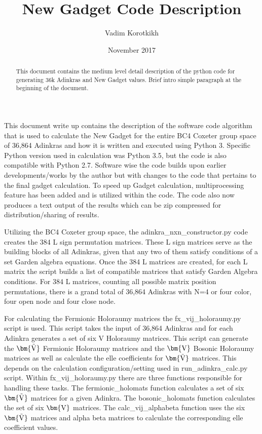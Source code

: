 \documentclass[12pt, letterpaper]{article}
\title{New Gadget Code Description}
\author{Vadim Korotkikh}
\date{November 2017}
\def\brV{{\bm {\rm V}}}
\def\brtV{{\bm{\tilde{\rm V}}}}
\begin{document}
\maketitle

\begin{abstract}
This document contains the medium level detail description of the python code
for generating 36k Adinkras and New Gadget values. Brief intro simple paragraph
at the beginning of the document.
\end{abstract}

This document write up contains the description of the software code algorithm
that is used to calculate the New Gadget for the entire BC4 Coxeter group space
of 36,864 Adinkras and how it is written and executed using Python 3.
Specific Python version used in calculation was Python 3.5, but the code is also
compatible with Python 2.7.
Software wise the code builds upon earlier developments/works by the author but
with changes to the code that pertains to the final gadget calculation.
To speed up Gadget calculation, multiprocessing feature has been added and is
utilized within the code. The code also now produces a text output of the
results which can be zip compressed for distribution/sharing of results.\par
Utilizing the BC4 Coxeter group space, the adinkra{\_}nxn{\_}constructor.py
code creates the 384 L sign permutation matrices. These L sign matrices serve as the building
blocks of all Adinkras, given that any two of them satisfy conditions of a set Garden algebra
equations. Once the 384 L matrices are created, for each L matrix the script builds a list of
compatible matrices that satisfy Garden Algebra conditions. For 384 L matrices, counting all
possible matrix position permutations, there is a grand total of 36,864 Adinkras with N=4 or
four color, four open node and four close node.\par
For calculating the Fermionic Holoraumy matrices the
fx{\_}vij{\_}holoraumy.py script is used.
This script takes the input of 36,864 Adinkras and for each Adinkra generates a set of six
V Holoraumy matrices. This script can generate the $\brtV$ Fermionic Holoraumy matrices and the
$\brV$ Bosonic Holoraumy matrices as well as calculate the elle coefficients for $\brtV$ matrices.
This depends on the calculation configuration/setting used in run{\_}adinkra{\_}calc.py
script. Within fx{\_}vij{\_}holoraumy.py there are three functions responsible for handling these tasks.
The fermionic{\_}holomats function calculates a set of six $\brtV$ matrices for a
given Adinkra. The bosonic{\_}holomats function calculates the set of six $\brV$ matrices.
The calc{\_}vij{\_}alphabeta function uses the six $\brtV$ matrices and alpha beta matrices
to calculate the corresponding elle coefficient values.
\end{document}
